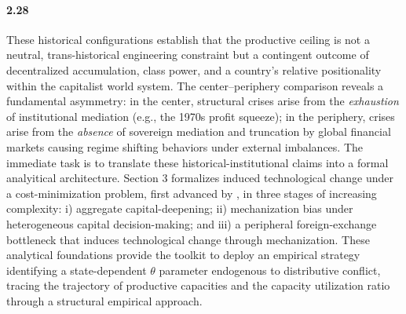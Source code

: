 \paragraph{2.28}
These historical configurations establish that the productive
ceiling is not a neutral, trans-historical engineering
constraint but a contingent outcome of decentralized
accumulation, class power, and a country's relative
positionality within the capitalist world system. The
center--periphery comparison reveals a fundamental asymmetry:
in the center, structural crises arise from the
\textit{exhaustion} of institutional mediation (e.g., the
1970s profit squeeze); in the periphery, crises arise from
the \textit{absence} of sovereign mediation and 
truncation by global financial markets causing regime shifting behaviors under external imbalances. The immediate task
is to translate these historical-institutional claims into a
formal analyitical architecture. Section 3 formalizes
induced technological change under a cost-minimization
problem, first advanced by \citet{CajasGuajirro2024}, in
three stages of increasing complexity: i) aggregate
capital-deepening; ii) mechanization bias under heterogeneous
capital decision-making; and iii) a peripheral
foreign-exchange bottleneck that induces technological change
through mechanization. These analytical foundations provide
the toolkit to deploy an empirical strategy identifying a
state-dependent $\theta$ parameter endogenous to
distributive conflict, tracing the trajectory of productive
capacities and the capacity utilization ratio through a
structural empirical approach.

